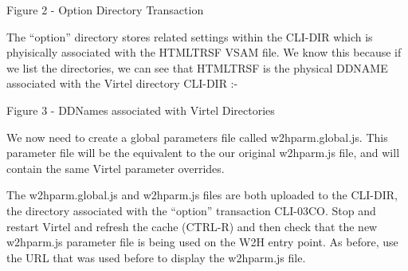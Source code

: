 \documentclass[letterpaper,10pt,english]{sphinxmanual}
\begin{document}
Figure 2 - Option Directory Transaction

The “option” directory stores related settings within the CLI-DIR which is phyisically associated with the HTMLTRSF VSAM file. We know this because if we list the directories, we can see that HTMLTRSF is the physical DDNAME associated with the Virtel directory CLI-DIR :-

Figure 3 - DDNames associated with Virtel Directories

We now need to create a global parameters file called w2hparm.global.js. This parameter file will be the equivalent to the our original w2hparm.js file, and will contain the same Virtel parameter overrides.

\begin{sphinxVerbatim}[commandchars=\\\{\}]
  
     
   
\end{sphinxVerbatim}

The w2hparm.global.js and w2hparm.js files are both uploaded to the CLI-DIR, the directory associated with the “option” transaction CLI-03CO. Stop and restart Virtel and refresh the cache (CTRL-R) and then check that the new w2hparm.js parameter file is being used on the W2H entry point. As before, use the URL that was used before to display the w2hparm.js file.
\end{document}
